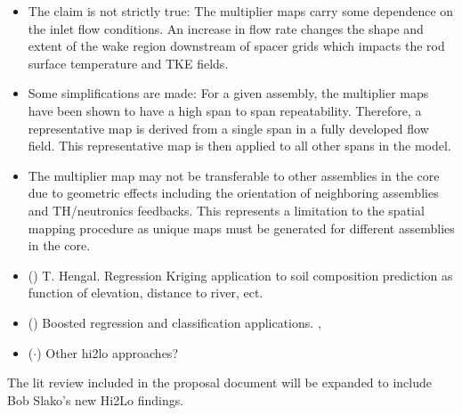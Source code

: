\begin{itemize}
     \item The claim is not strictly true: The multiplier maps carry some dependence on the inlet flow conditions.  An increase in flow rate changes the shape and extent of the wake region downstream of spacer grids which impacts the rod surface temperature and TKE fields.

     \item Some simplifications are made:  For a given assembly, the multiplier maps have been shown to have a high span to span repeatability.  Therefore, a representative map is derived from a single span in a fully developed flow field.  This representative map is then applied to all other spans in the model.

     \item The multiplier map may not be transferable to other assemblies in the core due to geometric effects including the orientation of neighboring assemblies and TH/neutronics feedbacks.  This represents a limitation to the spatial mapping procedure as unique maps must be generated for different assemblies in the core.

    \item (\checkmark) T. Hengal. Regression Kriging application to soil composition prediction as function of elevation, distance to river, ect. \cite{Hengl07}
    \item (\checkmark) Boosted regression and classification applications. \cite{moisen2006}, \cite{friedman2002}
    \item ($\cdot$) Other hi2lo approaches?
\end{itemize}

The lit review included in the proposal document will be expanded to include Bob Slako's new Hi2Lo findings.
